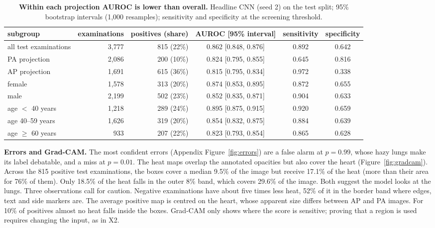 \documentclass[11pt,a4paper]{article}
\begin{document}
\begin{table}[t]
\centering\footnotesize
\caption{\textbf{Within each projection AUROC is lower than overall.} Headline CNN (seed 2) on the test split; 95\%
bootstrap intervals (1{,}000 resamples); sensitivity and specificity at the screening threshold.}
\label{tab:subgroups}
\begin{tabular}{lrrccc}
\toprule
subgroup & examinations & positives (share) & AUROC [95\% interval] & sensitivity & specificity \\
\midrule
all test examinations & 3{,}777 & 815 (22\%) & 0.862 [0.848, 0.876] & 0.892 & 0.642 \\
\midrule
PA projection & 2{,}086 & 200 (10\%) & 0.824 [0.795, 0.855] & 0.645 & 0.816 \\
AP projection & 1{,}691 & 615 (36\%) & 0.815 [0.795, 0.834] & 0.972 & 0.338 \\
\midrule
female & 1{,}578 & 313 (20\%) & 0.874 [0.853, 0.895] & 0.872 & 0.655 \\
male & 2{,}199 & 502 (23\%) & 0.852 [0.835, 0.871] & 0.904 & 0.633 \\
\midrule
age $<$ 40 years & 1{,}218 & 289 (24\%) & 0.895 [0.875, 0.915] & 0.920 & 0.659 \\
age 40--59 years & 1{,}626 & 319 (20\%) & 0.854 [0.832, 0.875] & 0.884 & 0.639 \\
age $\geq$ 60 years & 933 & 207 (22\%) & 0.823 [0.793, 0.854] & 0.865 & 0.628 \\
\bottomrule
\end{tabular}
\end{table}

\textbf{Errors and Grad-CAM.} The most confident errors (Appendix Figure~\ref{fig:errors}) are a false alarm at $p = 0.99$, whose hazy lungs make its label debatable, and a miss at $p = 0.01$. The heat maps overlap the annotated opacities but also cover the heart (Figure~\ref{fig:gradcam}). Across the 815 positive
test examinations, the boxes cover a median 9.5\% of the image but receive 17.1\% of the heat (more than their area for 76\% of them). Only 18.5\% of the heat falls in the outer 8\% band, which covers 29.6\% of the image. Both suggest the model looks at the lungs. Three observations call for caution. Negative examinations have about five times less heat,
52\% of it in the border band where edges, text and side markers are. The average positive map is centred on the heart,
whose apparent size differs between AP and PA images. For 10\% of positives almost no heat falls inside the boxes. Grad-CAM only shows where the score is sensitive; proving that a region is used requires changing the input, as in X2.
\end{document}
